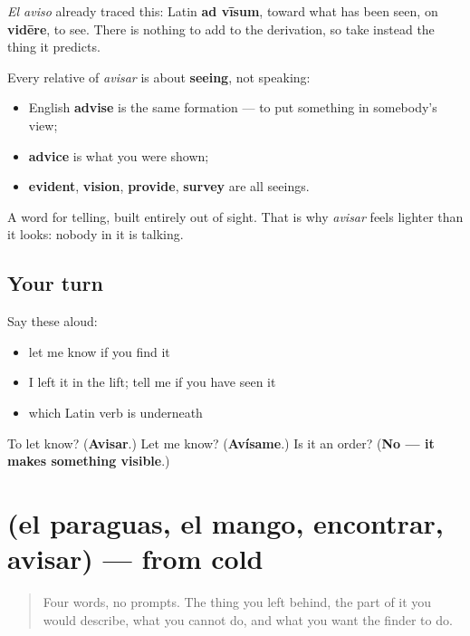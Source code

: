 \begin{cousinweb}
\emph{El aviso} already traced this: Latin \textbf{ad vīsum}, toward what has been seen, on \textbf{vidēre}, to see. There is nothing to add to the derivation, so take instead the thing it predicts.

Every relative of \emph{avisar} is about \textbf{seeing}, not speaking:

\begin{itemize}
\raggedright
  \item English \textbf{advise} is the same formation — to put something in somebody's view;
  \item \textbf{advice} is what you were shown;
  \item \textbf{evident}, \textbf{vision}, \textbf{provide}, \textbf{survey} are all seeings.
\end{itemize}

A word for telling, built entirely out of sight. That is why \emph{avisar} feels lighter than it looks: nobody in it is talking.
\end{cousinweb}

\subsection*{Your turn}
Say these aloud:

\begin{itemize}
\raggedright
  \item let me know if you find it
  \item I left it in the lift; tell me if you have seen it
  \item which Latin verb is underneath
\end{itemize}

\begin{tcolorbox}[breakable,colback=teal!4,colframe=teal!35!black,title={Before you move on}]
To let know? (\textbf{Avisar}.) Let me know? (\textbf{Avísame}.) Is it an order? (\textbf{No — it makes something visible}.)
\end{tcolorbox}
\section[(el paraguas, el mango, encontrar …]{(el paraguas, el mango, encontrar, avisar) — from cold}

\label{lesson:ES-R470-repaso-paraguas}



\begin{quote}
Four words, no prompts. The thing you left behind, the part of it you would describe, what you cannot do, and what you want the finder to do.
\end{quote}

